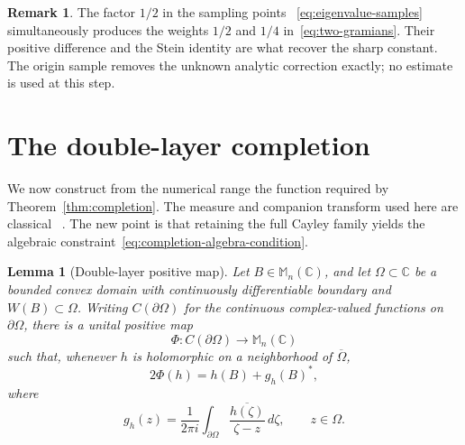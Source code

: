 \documentclass[preprints,article,submit,oneauthor]{Definitions/mdpi}
\newcounter{manuscriptresult}[section]
\theoremstyle{mdpi}
\newtheorem{lemma}[manuscriptresult]{Lemma}
\theoremstyle{definition}
\newtheorem{remark}[manuscriptresult]{Remark}
\newcommand{\C}{\mathbb C}
\newcommand{\Mn}{\mathbb M_n(\C)}
\begin{document}
\begin{remark}
\label{rem:completion-novelty}
The factor $1/2$ in the sampling points~%
\eqref{eq:eigenvalue-samples} simultaneously produces the weights
$1/2$ and $1/4$ in~\eqref{eq:two-gramians}.  Their positive difference
and the Stein identity are what recover the sharp constant.  The
origin sample removes the unknown analytic correction exactly; no
estimate is used at this step.
\end{remark}

\section{The double-layer completion}
\label{sec:double-layer}

We now construct from the numerical range the function required by
Theorem~\ref{thm:completion}.  The measure and companion transform used
here are classical~%
\cite{DelyonDelyon1999,Crouzeix2007,CrouzeixPalencia2017}.  The new
point is that retaining the full Cayley family yields the algebraic
constraint~\eqref{eq:completion-algebra-condition}.

\begin{lemma}[Double-layer positive map]
\label{lem:double-layer-map}
Let $B\in\Mn$, and let $\Omega\subset\C$ be a bounded convex domain
with continuously differentiable boundary and
$W(B)\subset\Omega$.  Writing $C(\partial\Omega)$ for the continuous
complex-valued functions on $\partial\Omega$, there is a unital positive map
\[
  \Phi\colon C(\partial\Omega)\longrightarrow\Mn
\]
such that, whenever $h$ is holomorphic on a neighborhood of
$\overline\Omega$,
\begin{equation}
  2\Phi(h)=h(B)+g_h(B)^*,
  \label{eq:double-layer-identity}
\end{equation}
where
\begin{equation}
  g_h(z)=\frac{1}{2\pi i}
  \int_{\partial\Omega}
  \frac{\overline{h(\zeta)}}{\zeta-z}\,d\zeta,
  \qquad z\in\Omega.
  \label{eq:companion-transform}
\end{equation}
\end{lemma}
\end{document}
